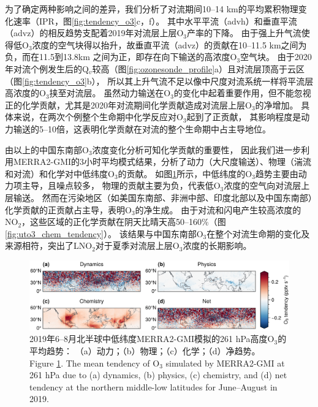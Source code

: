 为了确定两种影响之间的差异，我们分析了对流期间10--14 km的平均累积物理变化速率（IPR，图\ref{fig:tendency_o3}c，f）。
其中水平平流（advh）和垂直平流（advz）的相反趋势支配着2019年对流层上层O$_3$产率的下降。
由于强上升气流使得低O$_3$浓度的空气块得以抬升，故垂直平流（advz）的贡献在10--11.5 km之间为负，而在11.5到13.8km 之间为正，即存在向下输送的高浓度O$_3$空气块。
由于2020年对流个例发生后的Q$_v$较高（图\ref{fig:ozonesonde_profile}a）且对流层顶高于云区（图\ref{fig:tendency_o3}b），
所以其上升气流不足以像中尺度对流系统一样将平流层高浓度的O$_3$挟至对流层\citep{Phoenix.2020}。
虽然动力输送在O$_3$的变化中起着重要作用，但不能忽视正的化学贡献，尤其是2020年对流期间化学贡献造成对流层上层O$_3$的净增加。
具体来说，在两次个例整个生命期中化学反应对O$_3$起到了正贡献，
其影响程度是动力输送的5--10倍，这表明化学贡献在对流的整个生命期中占主导地位。

由以上的中国东南部O$_3$浓度变化分析可知化学贡献的重要性，
因此我们进一步利用MERRA2-GMI的3小时平均模式结果，分析了动力（大尺度输送）、物理（湍流和对流）和化学对中低纬度O$_3$的贡献。
如图\ref{fig:uto3_tendency}所示，中低纬度的O$_3$趋势主要由动力项主导，且噪点较多，
物理的贡献主要为负，代表低O$_3$浓度的空气向对流层上层输送。
然而在污染地区（如美国东南部、非洲中部、印度北部以及中国东南部）化学贡献的正贡献占主导，表明O$_3$的净生成。
由于对流和闪电产生较高浓度的NO$_2$，这些区域的正化学贡献在阴天比晴天高50--160\%（图\ref{fig:uto3_chem_tendency}）。
该结果与中国东南部O$_3$在整个对流生命期的变化及来源相符，突出了LNO$_2$对于夏季对流层上层O$_3$浓度的长期影响。


\begin{figure}[H]
    \centering
    \includegraphics[width=\textwidth]{./figures/uto3_tendency.png}
    \caption{
    2019年6--8月北半球中低纬度MERRA2-GMI模拟的261 hPa高度O$_3$的平均趋势：
    （a）动力；（b）物理；（c）化学；（d）净趋势。\\
    Figure \ref{fig:uto3_tendency}. The mean tendency of O$_3$ simulated by MERRA2-GMI at 261 hPa due to (a) dynamics, (b) physics, (c) chemistry, and (d) net tendency at the northern middle-low latitudes for June--August in 2019.
    }
    \label{fig:uto3_tendency}
\end{figure}


